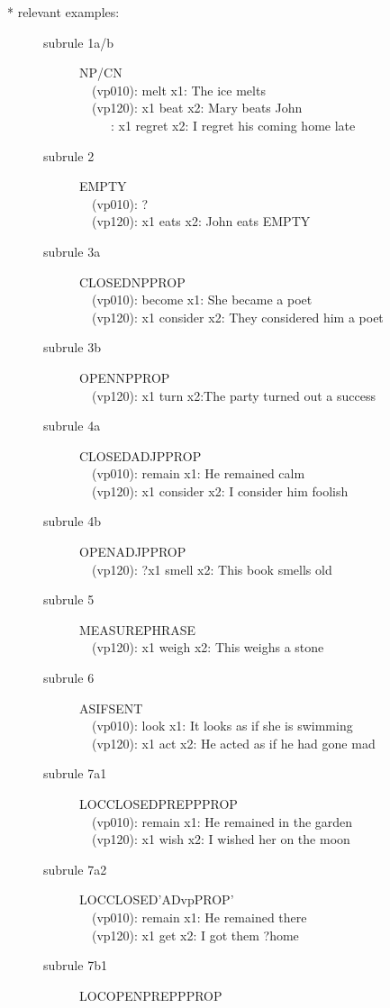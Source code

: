 \begin{description}
\item[* relevant examples:] \mbox{}
\begin{description}
\item [subrule 1a/b] NP/CN\\
\ \ (vp010): melt x1: The ice melts\\
\ \ (vp120): x1 beat x2: Mary beats John\\
\ \ \ \ \  : x1 regret x2: I regret his coming home late\\
\item [subrule 2] EMPTY\\
\ \ (vp010): ? \\
\ \ (vp120): x1 eats x2: John eats EMPTY
\item [subrule 3a] CLOSEDNPPROP\\
\ \ (vp010): become x1: She became a poet\\
\ \ (vp120): x1 consider x2: They considered him a poet
\item [subrule 3b] OPENNPPROP\\
\ \ (vp120): x1 turn x2:The party turned out a success 
\item [subrule 4a] CLOSEDADJPPROP\\
\ \ (vp010): remain x1: He remained calm\\
\ \ (vp120): x1 consider x2: I consider him foolish
\item [subrule 4b] OPENADJPPROP\\
\ \ (vp120): ?x1 smell x2: This book smells old
\item [subrule 5] MEASUREPHRASE\\
\ \ (vp120): x1 weigh x2: This weighs a stone
\item [subrule 6] ASIFSENT\\
\ \ (vp010): look x1: It looks as if she is swimming\\
\ \ (vp120): x1 act x2: He acted as if he had gone mad
\item [subrule 7a1] LOCCLOSEDPREPPPROP\\
\ \ (vp010): remain x1: He remained in the garden\\
\ \ (vp120): x1 wish x2: I wished her on the moon\\
\item [subrule 7a2] LOCCLOSED'ADvpPROP'\\
\ \ (vp010): remain x1: He remained there\\
\ \ (vp120): x1 get x2: I got them ?home
\item [subrule 7b1] LOCOPENPREPPPROP\\

\end{description}
\end{description}
